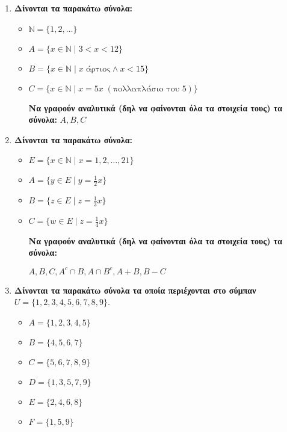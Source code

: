 \documentclass[a4paper,12pt]{article}
\begin{document}
\thispagestyle{empty}

\begin{center}
\end{center}
\begin{enumerate}

\item \textbf{Δίνονται τα παρακάτω σύνολα:}

\begin{itemize}
\item $\mathbb{N}=\{1,2,\ldots \}$
\item $A=\{x\in \mathbb{N}\mid 3<x<12\}$
\item $B=\{x\in \mathbb{N}\mid x \;\text{άρτιος}\wedge x<15\}$
\item $C=\{x\in \mathbb{N}\mid x=5x \;(\text{πολλαπλάσιο του $5$})\}$

\vspace{.5cm}
\textbf{Να γραφούν αναλυτικά (δηλ να φαίνονται όλα τα στοιχεία τους) τα σύνολα:} $A,B,C$

\end{itemize}

\item \textbf{Δίνονται τα παρακάτω σύνολα:}

\begin{itemize}
\item $E=\{x\in \mathbb{N}\mid x=1,2,\ldots,21\}$
\item $A=\{y\in E\mid y=\frac{1}{2}x\}$
\item $B=\{z\in E\mid z=\frac{1}{3}x\}$
\item $C=\{w\in E\mid z=\frac{1}{4}x\}$

\vspace{.5cm}
\textbf{Να γραφούν αναλυτικά (δηλ να φαίνονται όλα τα στοιχεία τους) τα σύνολα: }

$A, B, C, A^c\cap B, A\cap B^c, A+B, B-C$
\end{itemize}

\item \textbf{Δίνονται τα παρακάτω σύνολα τα οποία περιέχονται στο σύμπαν} $U=\{1,2,3,4,5,6,7,8,9\}$.

\begin{itemize}
\item $A=\{1,2,3,4,5\}$
\item $B=\{4,5,6,7\}$
\item $C=\{5,6,7,8,9\}$
\item $D=\{1,3,5,7,9\}$
\item $E=\{2,4,6,8\}$
\item $F=\{1,5,9\}$
\end{itemize}


\end{enumerate}
\end{document}
